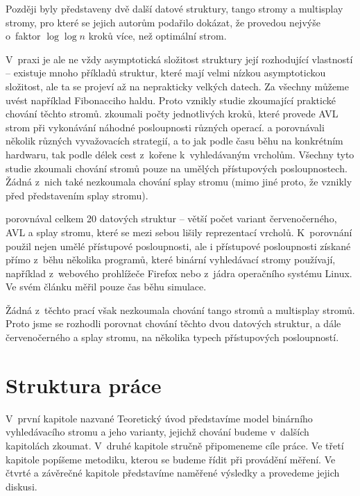 Později byly představeny dvě další datové struktury, tango stromy a multisplay stromy, pro které se jejich autorům podařilo dokázat, že provedou nejvýše o~faktor $\log\log n$ kroků více, než optimální strom.

V~praxi je ale ne vždy asymptotická složitost struktury její rozhodující
vlastností -- existuje mnoho příkladů struktur, které mají velmi nízkou
asymptotickou složitost, ale ta se projeví až na neprakticky velkých datech. Za
všechny můžeme uvést například Fibonacciho haldu. Proto vznikly studie
zkoumající praktické chování těchto stromů. \citet{AVLperformance} zkoumali
počty jednotlivých kroků, které provede AVL strom při vykonávání náhodné
posloupnosti různých operací. \citet{comparison} a \citet{comparison2}
porovnávali několik různých vyvažovacích strategií, a to jak podle času běhu na konkrétním hardwaru, tak
podle délek cest z~kořene k~vyhledávaným vrcholům. Všechny tyto studie zkoumali
chování stromů pouze na umělých přístupových posloupnostech. Žádná z~nich také
nezkoumala chování splay stromu (mimo jiné proto, že vznikly před představením
splay stromu).

\citet{performance} porovnával celkem 20 datových struktur -- větší počet variant červenočerného, AVL a splay stromu, které se mezi sebou lišily reprezentací vrcholů. K~porovnání použil nejen umělé přístupové posloupnosti, ale i přístupové posloupnosti získané přímo z~běhu několika programů, které binární vyhledávací stromy používají, například z~webového prohlížeče Firefox nebo z~jádra operačního systému Linux. Ve svém článku měřil pouze čas běhu simulace.

Žádná z~těchto prací však nezkoumala chování tango stromů a multisplay stromů. Proto jsme se rozhodli porovnat chování těchto dvou datových struktur, a dále červenočerného a splay stromu, na několika typech přístupových posloupností.

\section*{Struktura práce}

V~první kapitole nazvané Teoretický úvod představíme model binárního vyhledávacího stromu a jeho varianty, jejichž chování budeme v~dalších kapitolách zkoumat. V~druhé kapitole stručně připomeneme cíle práce. Ve třetí kapitole popíšeme metodiku, kterou se budeme řídit při provádění měření. Ve čtvrté a závěrečné kapitole představíme naměřené výsledky a provedeme jejich diskusi.
